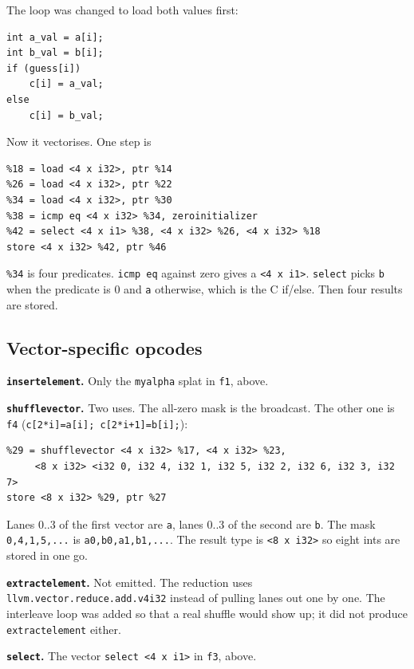 \documentclass[11pt,a4paper]{article}
\begin{document}
The loop was changed to load both values first:

\begin{lstlisting}[language={}]
int a_val = a[i];
int b_val = b[i];
if (guess[i])
    c[i] = a_val;
else
    c[i] = b_val;
\end{lstlisting}

Now it vectorises. One step is

\begin{lstlisting}
%18 = load <4 x i32>, ptr %14
%26 = load <4 x i32>, ptr %22
%34 = load <4 x i32>, ptr %30
%38 = icmp eq <4 x i32> %34, zeroinitializer
%42 = select <4 x i1> %38, <4 x i32> %26, <4 x i32> %18
store <4 x i32> %42, ptr %46
\end{lstlisting}

\texttt{\%34} is four predicates. \texttt{icmp eq} against zero gives a
\texttt{<4 x i1>}. \texttt{select} picks \texttt{b} when the predicate is
0 and \texttt{a} otherwise, which is the C if/else. Then four results
are stored.

\subsection*{Vector-specific opcodes}

\textbf{\texttt{insertelement}.} Only the \texttt{myalpha} splat in
\texttt{f1}, above.

\textbf{\texttt{shufflevector}.} Two uses. The all-zero mask is the
broadcast. The other one is \texttt{f4}
(\texttt{c[2*i]=a[i]; c[2*i+1]=b[i];}):

\begin{lstlisting}
%29 = shufflevector <4 x i32> %17, <4 x i32> %23,
     <8 x i32> <i32 0, i32 4, i32 1, i32 5, i32 2, i32 6, i32 3, i32 7>
store <8 x i32> %29, ptr %27
\end{lstlisting}

Lanes 0..3 of the first vector are \texttt{a}, lanes 0..3 of the second
are \texttt{b}. The mask \texttt{0,4,1,5,...} is
\texttt{a0,b0,a1,b1,...}. The result type is \texttt{<8 x i32>} so eight
ints are stored in one go.

\textbf{\texttt{extractelement}.} Not emitted. The reduction uses
\texttt{llvm.vector.reduce.add.v4i32} instead of pulling lanes out one
by one. The interleave loop was added so that a real shuffle would show
up; it did not produce \texttt{extractelement} either.

\textbf{\texttt{select}.} The vector \texttt{select <4 x i1>} in
\texttt{f3}, above.
\end{document}
